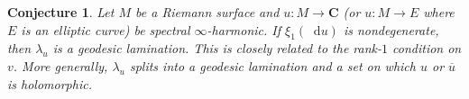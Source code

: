 \documentclass[reqno,11pt]{amsart}
\newcommand{\CC}{\mathbf{C}}
\newcommand*\dif{\mathop{}\!\mathrm{d}}
\newtheorem{conjecture}[theorem]{Conjecture}
\theoremstyle{definition}
\numberwithin{equation}{section}
\begin{document}
\begin{conjecture}
Let $M$ be a Riemann surface and $u: M \to \CC$ (or $u: M \to E$ where $E$ is an elliptic curve) be spectral $\infty$-harmonic.
If $\xi_1(\dif u)$ is nondegenerate, then $\lambda_u$ is a geodesic lamination.
This is closely related to the rank-$1$ condition on $v$.
More generally, $\lambda_u$ splits into a geodesic lamination and a set on which $u$ or $\overline u$ is holomorphic.
\end{conjecture}


\printbibliography
\end{document}
